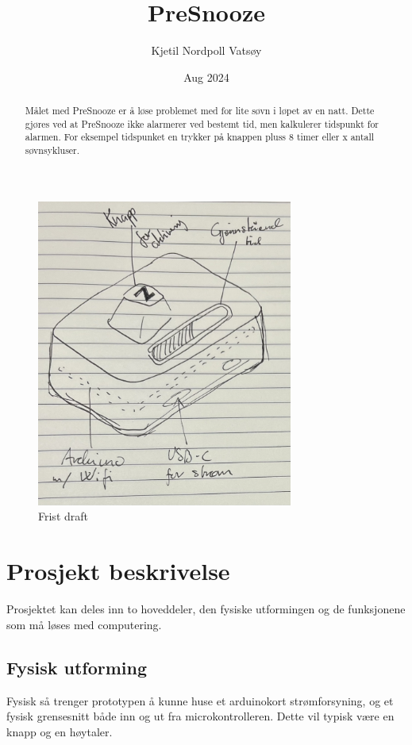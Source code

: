 \documentclass[12pt, a4paper]{article}
\begin{document}
\title{PreSnooze} 
\author{Kjetil Nordpoll Vatsøy}
\date{Aug 2024}

\maketitle

\pagebreak

\begin{figure}[h]
\centering
\includegraphics[width=0.75\textwidth]{IMG_2505.png}
\caption{Frist draft}
\end{figure}   

\begin{abstract}
Målet med PreSnooze er å løse problemet med for lite søvn i løpet av en natt. 
Dette gjøres ved at PreSnooze ikke alarmerer ved bestemt tid, men kalkulerer tidspunkt for alarmen. For eksempel tidspunket en trykker på knappen pluss 8 timer eller x antall søvnsykluser.
\end{abstract}

\pagebreak

\section{Prosjekt beskrivelse}

Prosjektet kan deles inn to hoveddeler, den fysiske utformingen og de funksjonene som må løses med computering. 
\subsection*{Fysisk utforming}
Fysisk så trenger prototypen å kunne huse et arduinokort strømforsyning, og et fysisk grensesnitt både inn og ut fra microkontrolleren. 
Dette vil typisk være en knapp og en høytaler.  
\end{document}
